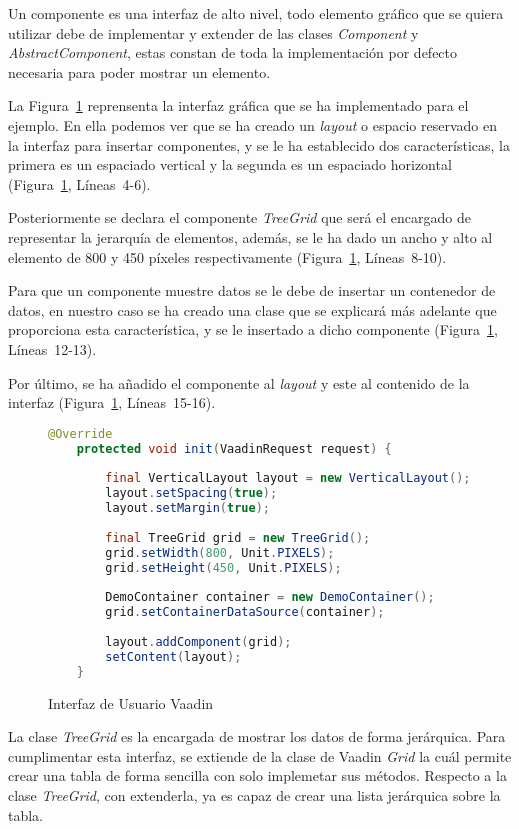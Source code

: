 Un componente es una interfaz de alto nivel, todo elemento gráfico que se quiera utilizar debe de implementar y extender de las clases \emph{Component}\cite{componentVaadin} y \emph{AbstractComponent}\cite{abstractComponentVaadin}, estas constan de toda la implementación por defecto necesaria para poder mostrar un elemento.

La Figura~\ref{fig:uiVaadin} reprensenta la interfaz gráfica que se ha implementado para el ejemplo. En ella podemos ver que se ha creado un \emph{layout} o espacio reservado en la interfaz para insertar componentes, y se le ha establecido dos características, la primera es un espaciado vertical y la segunda es un espaciado horizontal (Figura~\ref{fig:uiVaadin}, Líneas~4-6).

Posteriormente se declara el componente \emph{TreeGrid} que será el encargado de representar la jerarquía de elementos, además, se le ha dado un ancho y alto al elemento de 800 y 450 píxeles respectivamente (Figura~\ref{fig:uiVaadin}, Líneas~8-10).

Para que un componente muestre datos se le debe de insertar un contenedor de datos, en nuestro caso se ha creado una clase que se explicará más adelante que proporciona esta característica, y se le insertado a dicho componente (Figura~\ref{fig:uiVaadin}, Líneas~12-13).

Por último, se ha añadido el componente al \emph{layout} y este al contenido de la interfaz (Figura~\ref{fig:uiVaadin}, Líneas~15-16).

\begin{figure}[!tb]
	\centering
	\begin{lstlisting}[language=Java]
	@Override
	protected void init(VaadinRequest request) {
	
		final VerticalLayout layout = new VerticalLayout();
		layout.setSpacing(true);
		layout.setMargin(true);
		
		final TreeGrid grid = new TreeGrid();
		grid.setWidth(800, Unit.PIXELS);
		grid.setHeight(450, Unit.PIXELS);
		
		DemoContainer container = new DemoContainer();
		grid.setContainerDataSource(container);
		
		layout.addComponent(grid);
		setContent(layout);
	}
	\end{lstlisting}
	\caption{Interfaz de Usuario Vaadin}
	\label{fig:uiVaadin}
\end{figure}

La clase \emph{TreeGrid} es la encargada de mostrar los datos de forma jerárquica. Para cumplimentar esta interfaz, se extiende de la clase de Vaadin \emph{Grid} la cuál permite crear una tabla de forma sencilla con solo implemetar sus métodos. Respecto a la clase \emph{TreeGrid}, con extenderla, ya es capaz de crear una lista jerárquica sobre la tabla.

